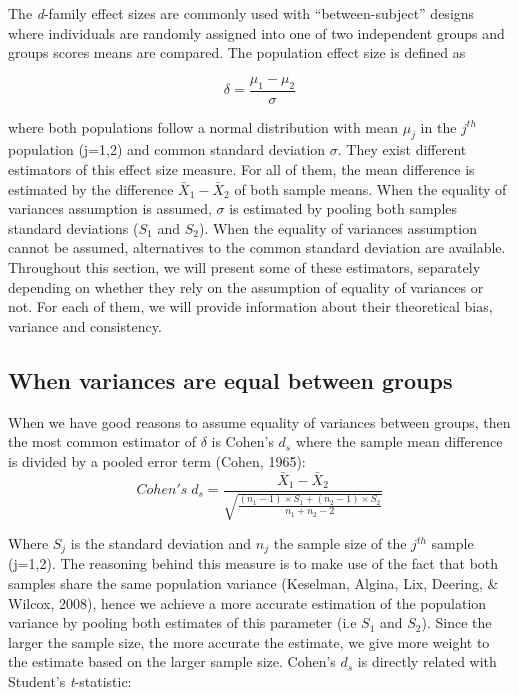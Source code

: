 \documentclass[
  man,floatsintext]{apa6}
\begin{document}
The \emph{d}-family effect sizes are commonly used with \enquote{between-subject} designs where individuals are randomly assigned into one of two independent groups and groups scores means are compared. The population effect size is defined as

\begin{equation} 
\delta = \frac{\mu_{1}-\mu_{2}}{\sigma} 
\label{eq:Cohendelta}
\end{equation}

where both populations follow a normal distribution with mean \(\mu_j\) in the \(j^{th}\) population (j=1,2) and common standard deviation \(\sigma\). They exist different estimators of this effect size measure. For all of them, the mean difference is estimated by the difference \(\bar{X}_1-\bar{X}_2\) of both sample means. When the equality of variances assumption is assumed, \(\sigma\) is estimated by pooling both samples standard deviations (\(S_1\) and \(S_2\)). When the equality of variances assumption cannot be assumed, alternatives to the common standard deviation are available. Throughout this section, we will present some of these estimators, separately depending on whether they rely on the assumption of equality of variances or not. For each of them, we will provide information about their theoretical bias, variance and consistency.

\hypertarget{when-variances-are-equal-between-groups}{%
\subsection{When variances are equal between groups}\label{when-variances-are-equal-between-groups}}

When we have good reasons to assume equality of variances between groups, then the most common estimator of \(\delta\) is Cohen's \(d_{s}\) where the sample mean difference is divided by a pooled error term (Cohen, 1965):
\begin{equation} 
Cohen's \; d_s = \frac{\bar{X}_1-\bar{X}_2}{\sqrt{\frac{(n_1-1) \times S_1+(n_2-1) \times S_2}{n_1+n_2-2}}} 
\label{eq:Cohends}
\end{equation}

Where \(S_j\) is the standard deviation and \(n_j\) the sample size of the \(j^{th}\) sample (j=1,2). The reasoning behind this measure is to make use of the fact that both samples share the same population variance (Keselman, Algina, Lix, Deering, \& Wilcox, 2008), hence we achieve a more accurate estimation of the population variance by pooling both estimates of this parameter (i.e \(S_1\) and \(S_2\)). Since the larger the sample size, the more accurate the estimate, we give more weight to the estimate based on the larger sample size. Cohen's \(d_{s}\) is directly related with Student's \emph{t}-statistic:
\end{document}
